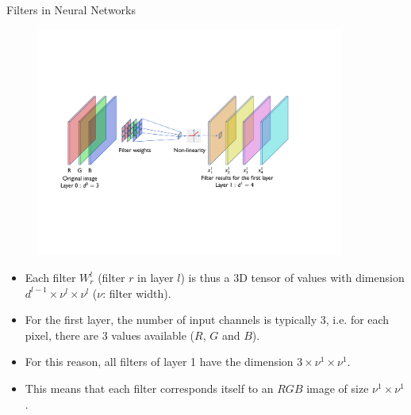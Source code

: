 \documentclass[xcolor=pdftex,dvipsnames,table]{beamer}
\begin{document}
\begin{frame}{Filters in Neural Networks}
\begin{figure}[htb]
\includegraphics[width=0.9\textwidth]{../graphics/CNN_FirstLayer.pdf}
\end{figure}
\begin{itemize}
	\item Each filter $W^l_r$ (filter $r$ in layer $l$) is thus a 3D tensor of values with dimension $d^{l-1}\times \nu^l\times \nu^l$ ($\nu$: filter width).
	\item For the first layer, the number of input channels is typically 3, i.e. for each pixel, there are 3 values available ($R$, $G$ and $B$).  
	\item For this reason, all filters of layer 1 have the dimension $3\times \nu^{1}\times \nu^{1}$. 
	\item This means that each filter corresponds itself to an $RGB$ image of size $\nu^{1}\times \nu^{1}$. 
\end{itemize}
\end{frame}
\end{document}

